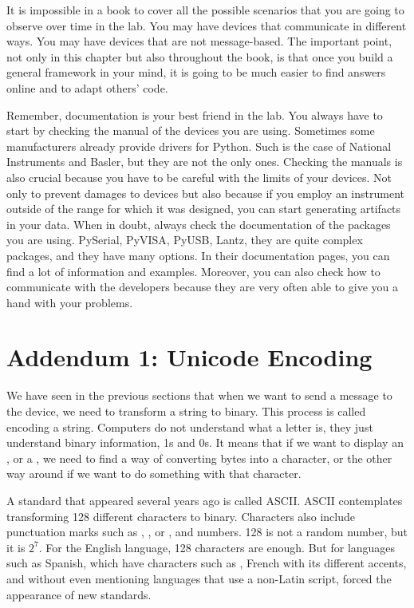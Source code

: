 It is impossible in a book to cover all the possible scenarios that you are going to observe over time in the lab. You may have devices that communicate in different ways. You may have devices that are not message-based. The important point, not only in this chapter but also throughout the book, is that once you build a general framework in your mind, it is going to be much easier to find answers online and to adapt others' code.

Remember, documentation is your best friend in the lab. You always have to start by checking the manual of the devices you are using. Sometimes some manufacturers already provide drivers for Python. Such is the case of National Instruments and Basler, but they are not the only ones. Checking the manuals is also crucial because you have to be careful with the limits of your devices. Not only to prevent damages to devices but also because if you employ an instrument outside of the range for which it was designed, you can start generating artifacts in your data. When in doubt, always check the documentation of the packages you are using. PySerial, PyVISA, PyUSB, Lantz, they are quite complex packages, and they have many options. In their documentation pages, you can find a lot of information and examples. Moreover, you can also check how to communicate with the developers because they are very often able to give you a hand with your problems.

\section{Addendum 1: Unicode Encoding}\label{sec:unicode}
We have seen in the previous sections that when we want to send a message to the device, we need to transform a string to binary. This process is called encoding a string. Computers do not understand what a letter is, they just understand binary information, 1s and 0s. It means that if we want to display an , or a , we need to find a way of converting bytes into a character, or the other way around if we want to do something with that character.

A standard that appeared several years ago is called ASCII. ASCII contemplates transforming 128 different characters to binary. Characters also include punctuation marks such as , \py{!}, or \py{:}, and numbers. 128 is not a random number, but it is $2^7$. For the English language, 128 characters are enough. But for languages such as Spanish, which have characters such as , French with its different accents, and without even mentioning languages that use a non-Latin script, forced the appearance of new standards.

